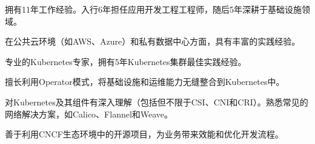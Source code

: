 

\begin{cvparagraph}


拥有11年工作经验。入行6年担任应用开发工程工程师，随后5年深耕于基础设施领域。

在公共云环境（如AWS、Azure）和私有数据中心方面，具有丰富的实践经验。

专业的Kubernetes专家，拥有5年Kubernetes集群最佳实践经验。

擅长利用Operator模式，将基础设施和运维能力无缝整合到Kubernetes中。

对Kubernetes及其组件有深入理解（包括但不限于CSI、CNI和CRI）。熟悉常见的网络解决方案，如Calico、Flannel和Weave。

善于利用CNCF生态环境中的开源项目，为业务带来效能和优化开发流程。



\end{cvparagraph}



